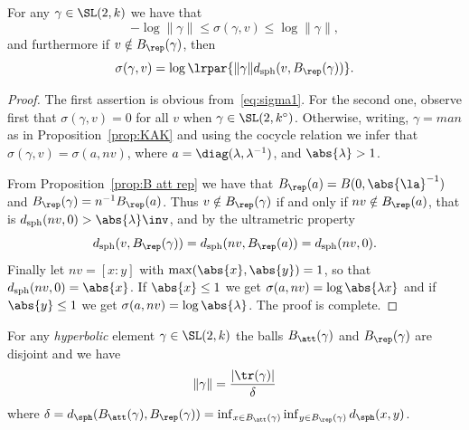 \begin{lemm}\label{lem:expand vector 1}
For any $\gamma\in \SL(2,k)$ we have that
\[
- \log \|\gamma\| \le \sigma(\gamma,v) \le \log\|\gamma\|,
\]
and furthermore if $v\notin B_\rep(\gamma)$, then
\[
\sigma(\gamma,v) = \log\lrpar{\|\gamma\| d_{\mathrm{sph}}(v,B_\rep(\gamma))}.
\]
\end{lemm}

\begin{proof}
The first assertion is obvious from~\eqref{eq:sigma1}. For the second one, observe first that $\sigma(\gamma,v) = 0$ for all $v$ when $\gamma\in \SL(2,k^\circ)$. Otherwise, writing, $ \gamma = m a n$ as in Proposition~\ref{prop:KAK} and using the cocycle relation we infer that $\sigma(\gamma, v) = \sigma(a, nv)$, where $a = \diag(\lambda, \lambda^{-1})$, and $\abs{\lambda}>1$.

From Proposition~\ref{prop:B att rep} we have that $B_{\rep}(a) = B(0, \abs{\la}^{-1})$ and $B_{\rep}(\gamma) = n^{-1}B_{\rep}(a)$. Thus $v\notin B_{\rep}(\gamma)$ if and only if $nv\notin B_{\rep}(a)$, that is $d_{\mathrm{sph}}(nv, 0) > \abs{\lambda}\inv$, and by the ultrametric property
\[
d_{\mathrm{sph}}(v, B_{\rep}(\gamma)) =d_{\mathrm{sph}}(nv, B_{\rep}(a))= d_{\mathrm{sph}}(nv, 0).
\]
Finally let $nv = [x:y]$ with $\max(\abs{x}, \abs{y}) = 1$, so that $d_{\mathrm{sph}}(nv, 0) = \abs{x}$. If $\abs{x}\leq 1$ we get $\sigma(a,nv) = \log \abs{\lambda x} $ and if $\abs{y}\leq 1$ we get $\sigma(a,nv) = \log \abs{\lambda}$. The proof is complete.
\end{proof}

\begin{lemm}\label{lem:expand vector 2}
For any \emph{hyperbolic} element $\gamma\in \SL(2,k)$ the balls $B_\att(\gamma)$ and $B_\rep(\gamma)$ are disjoint and we have
\begin{equation}\label{eq:expand}
\|\gamma\| = \frac{\mathopen|\tr(\gamma)\mathclose|}{\delta}
\end{equation}
where $\delta = d_{\sph} (B_\att(\gamma), B_\rep(\gamma)) =\inf_{x\in B_\att(\gamma)} \inf_{y\in B_\rep(\gamma)} d_{\sph}(x,y)$.
\end{lemm}

